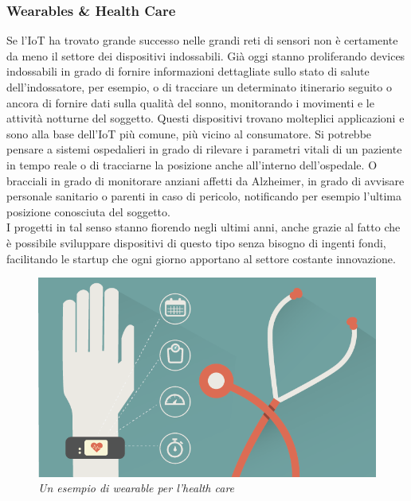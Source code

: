 \subsubsection{Wearables \& Health Care}
Se l'IoT ha trovato grande successo nelle grandi reti di sensori non è certamente da meno il settore dei dispositivi indossabili. Già oggi stanno proliferando devices indossabili in grado di fornire informazioni dettagliate sullo stato di salute dell'indossatore, per esempio, o di tracciare un determinato itinerario seguito o ancora di fornire dati sulla qualità del sonno, monitorando i movimenti e le attività notturne del soggetto. Questi dispositivi trovano molteplici applicazioni e sono alla base dell'IoT più comune, più vicino al consumatore. Si potrebbe pensare a sistemi ospedalieri in grado di rilevare i parametri vitali di un paziente in tempo reale o di tracciarne la posizione anche all'interno dell'ospedale. O bracciali in grado di monitorare anziani affetti da Alzheimer, in grado di avvisare personale sanitario o parenti in caso di pericolo, notificando per esempio l'ultima posizione conosciuta del soggetto.
\\I progetti in tal senso stanno fiorendo negli ultimi anni, anche grazie al fatto che è possibile sviluppare dispositivi di questo tipo senza bisogno di ingenti fondi, facilitando le startup che ogni giorno apportano al settore costante innovazione.
\begin{figure}[H]
\centering
\includegraphics[scale=0.40]{immagini/wearable.png}
\caption{\textit{Un esempio di wearable per l'health care}}
\end{figure}
